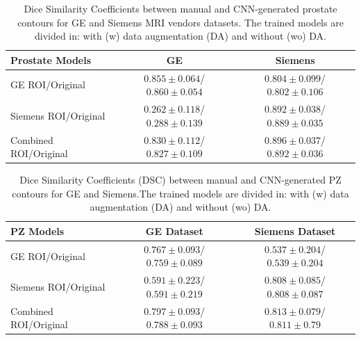 \newpage
\begin{table}[h]
    \caption{Dice Similarity Coefficients between manual and CNN-generated prostate contours for GE and Siemens MRI vendors datasets. The trained models are divided in: with (w) data augmentation (DA) and without (wo) DA.}
    \label{tab:res_prost}
    \begin{tabular}{lcc}
         \hline
          \textbf{Prostate Models} & \textbf{GE} & \textbf{Siemens }\\
         \hline
         GE ROI/Original & $0.855\pm0.064$/$\mathbf{0.860\pm0.054}$ & $0.804\pm0.099$/$0.802\pm0.106$ \\
         \hline
         Siemens ROI/Original & $0.262\pm0.118$/$0.288\pm0.139$ & $0.892\pm0.038$/$0.889\pm0.035$ \\
         \hline
         Combined ROI/Original & $0.830\pm0.112$/$0.827\pm0.109$ & $\mathbf{0.896\pm0.037}$/$0.892\pm0.036$\\
         \hline
    \end{tabular}
\end{table}

\begin{table}[h]
    \caption{Dice Similarity Coefficients (DSC) between manual and CNN-generated PZ contours for GE and Siemens.The trained models are divided in: with (w) data augmentation (DA) and without (wo) DA.}
    \label{tab:res_pz}
    \begin{tabular}{lcc}
         \hline
          \textbf{PZ Models} & \textbf{GE Dataset} & \textbf{Siemens Dataset}\\
         \hline
         GE ROI/Original & $0.767\pm0.093$/$0.759\pm0.089$ & $0.537\pm0.204$/$0.539\pm0.204$ \\
         \hline
         Siemens ROI/Original & $0.591\pm0.223$/$0.591\pm0.219$ & $0.808\pm0.085$/$0.808\pm0.087$ \\
         \hline
         Combined ROI/Original & $\mathbf{0.797\pm0.093}$/$0.788\pm0.093$ & $\mathbf{0.813\pm0.079}$/$0.811\pm0.79$\\
         \hline
    \end{tabular}
\end{table}

